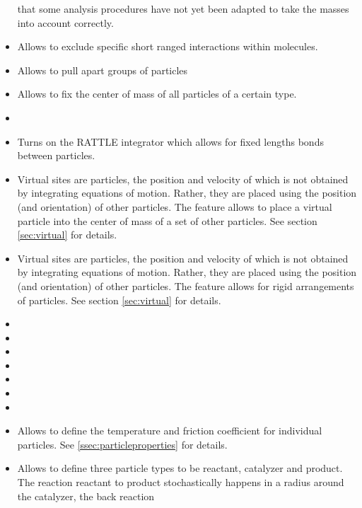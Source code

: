 \begin{itemize}
  that some analysis procedures have not yet been adapted to take the
  masses into account correctly.
\item {} Allows to exclude specific short ranged
  interactions within molecules.
\item {} Allows to pull apart groups of particles
\item {} Allows to fix the center of mass of all particles of a certain type.
\item {} 
\item {} Turns on the RATTLE integrator which
  allows for fixed lengths bonds between particles. 
\item {} Virtual sites are particles,
  the position and velocity of which is not obtained by integrating
  equations of motion. Rather, they are placed using the position (and
  orientation) of other particles. The feature 
  allows to place a virtual particle into the center of mass of a set
  of other particles. See section \ref{sec:virtual} for details.
\item {} Virtual sites are
  particles, the position and velocity of which is not obtained by
  integrating equations of motion. Rather, they are placed using the
  position (and orientation) of other particles. The feature
   allows for rigid arrangements of
  particles. See section \ref{sec:virtual} for details.
\item {}
\item {}
\item {}
\item {}
\item {}
\item {}
\item {}
\item {} Allows to define the temperature and
  friction coefficient for individual particles. See 
  \ref{ssec:particleproperties} for details.
\item {} Allows to define three particle types to be
  reactant, catalyzer and product. The reaction reactant to product 
  stochastically happens in a radius around the catalyzer, the back reaction

\end{itemize}
